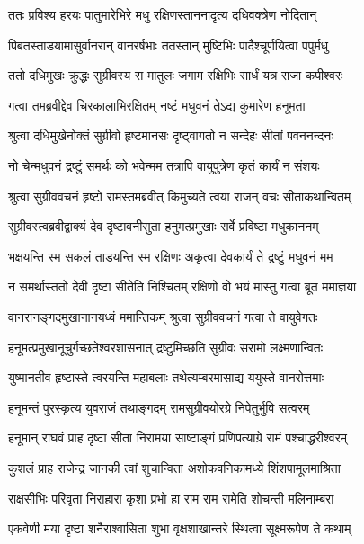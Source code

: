 \twolineshloka
{ततः प्रविश्य हरयः पातुमारेभिरे मधु}
{रक्षिणस्ताननादृत्य दधिवक्त्रेण नोदितान्} %

\twolineshloka
{पिबतस्ताडयामासुर्वानरान् वानरर्षभाः}
{ततस्तान् मुष्टिभिः पादैश्चूर्णयित्वा पपुर्मधु} %

\twolineshloka
{ततो दधिमुखः क्रुद्धः सुग्रीवस्य स मातुलः}
{जगाम रक्षिभिः सार्धं यत्र राजा कपीश्वरः} %

\twolineshloka
{गत्वा तमब्रवीद्देव चिरकालाभिरक्षितम्}
{नष्टं मधुवनं तेऽद्य कुमारेण हनूमता} %

\twolineshloka
{श्रुत्वा दधिमुखेनोक्तं सुग्रीवो हृष्टमानसः}
{दृष्ट्वागतो न सन्देहः सीतां पवननन्दनः} %

\twolineshloka
{नो चेन्मधुवनं द्रष्टुं समर्थः को भवेन्मम}
{तत्रापि वायुपुत्रेण कृतं कार्यं न संशयः} %

\twolineshloka
{श्रुत्वा सुग्रीववचनं हृष्टो रामस्तमब्रवीत्}
{किमुच्यते त्वया राजन् वचः सीताकथान्वितम्} %

\twolineshloka
{सुग्रीवस्त्वब्रवीद्वाक्यं देव दृष्टावनीसुता}
{हनुमत्प्रमुखाः सर्वे प्रविष्टा मधुकाननम्} %

\twolineshloka
{भक्षयन्ति स्म सकलं ताडयन्ति स्म रक्षिणः}
{अकृत्वा देवकार्यं ते द्रष्टुं मधुवनं मम} %

\twolineshloka
{न समर्थास्ततो देवी दृष्टा सीतेति निश्चितम्}
{रक्षिणो वो भयं मास्तु गत्वा ब्रूत ममाज्ञया} %

\twolineshloka
{वानरानङ्गदमुखानानयध्वं ममान्तिकम्}
{श्रुत्वा सुग्रीववचनं गत्वा ते वायुवेगतः} %

\twolineshloka
{हनूमत्प्रमुखानूचुर्गच्छतेश्वरशासनात्}
{द्रष्टुमिच्छति सुग्रीवः सरामो लक्ष्मणान्वितः} %

\twolineshloka
{युष्मानतीव हृष्टास्ते त्वरयन्ति महाबलाः}
{तथेत्यम्बरमासाद्य ययुस्ते वानरोत्तमाः} %

\twolineshloka
{हनूमन्तं पुरस्कृत्य युवराजं तथाङ्गदम्}
{रामसुग्रीवयोरग्रे निपेतुर्भुवि सत्वरम्} %

\twolineshloka
{हनूमान् राघवं प्राह दृष्टा सीता निरामया}
{साष्टाङ्गं प्रणिपत्याग्रे रामं पश्चाद्धरीश्वरम्} %

\twolineshloka
{कुशलं प्राह राजेन्द्र जानकी त्वां शुचान्विता}
{अशोकवनिकामध्ये शिंशपामूलमाश्रिता} %

\twolineshloka
{राक्षसीभिः परिवृता निराहारा कृशा प्रभो}
{हा राम राम रामेति शोचन्ती मलिनाम्बरा} %

\twolineshloka
{एकवेणी मया दृष्टा शनैराश्वासिता शुभा}
{वृक्षशाखान्तरे स्थित्वा सूक्ष्मरूपेण ते कथाम्} %

